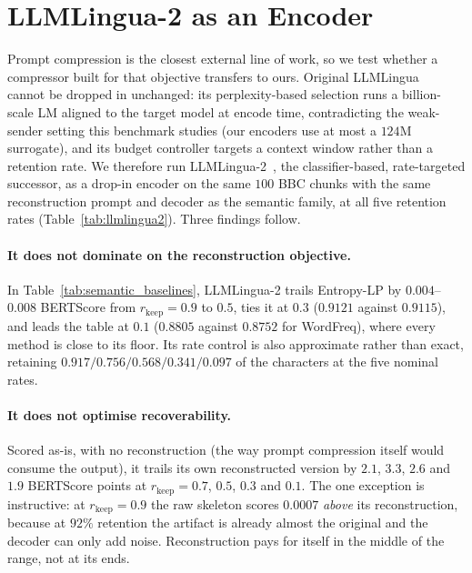 \documentclass[11pt]{article}
\newcommand{\rkeep}{r_{\mathrm{keep}}}
\begin{document}
\section{LLMLingua-2 as an Encoder}
\label{app:llmlingua2}

Prompt compression is the closest external line of work, so we test whether a compressor built for
that objective transfers to ours. Original LLMLingua~\citep{jiang2023llmlingua} cannot be dropped in
unchanged: its perplexity-based selection runs a billion-scale LM aligned to the target model at encode
time, contradicting the weak-sender setting this benchmark studies (our encoders use at most a $124$M
surrogate), and its budget controller targets a context window rather than a retention rate. We
therefore run LLMLingua-2~\citep{pan2024llmlingua}, the classifier-based, rate-targeted successor, as a
drop-in encoder on the same $100$ BBC chunks with the same reconstruction prompt and decoder as the
semantic family, at all five retention rates (Table~\ref{tab:llmlingua2}). Three findings follow.

\paragraph{It does not dominate on the reconstruction objective.}
In Table~\ref{tab:semantic_baselines}, LLMLingua-2 trails Entropy-LP by
$0.004$--$0.008$ BERTScore from $\rkeep = 0.9$ to $0.5$, ties it at $0.3$ ($0.9121$ against $0.9115$), and
leads the table at $0.1$ ($0.8805$ against $0.8752$ for WordFreq), where every method is close to its floor. Its rate
control is also approximate rather than exact, retaining $0.917/0.756/0.568/0.341/0.097$ of the
characters at the five nominal rates.

\paragraph{It does not optimise recoverability.}
Scored as-is, with no reconstruction (the way prompt compression itself would consume the output), it trails its own reconstructed version by $2.1$, $3.3$, $2.6$ and $1.9$ BERTScore points at
$\rkeep = 0.7$, $0.5$, $0.3$ and $0.1$. The one exception is instructive: at $\rkeep = 0.9$ the raw
skeleton scores $0.0007$ \emph{above} its reconstruction, because at $92\%$ retention the artifact is
already almost the original and the decoder can only add noise. Reconstruction pays for itself in the
middle of the range, not at its ends.
\end{document}
